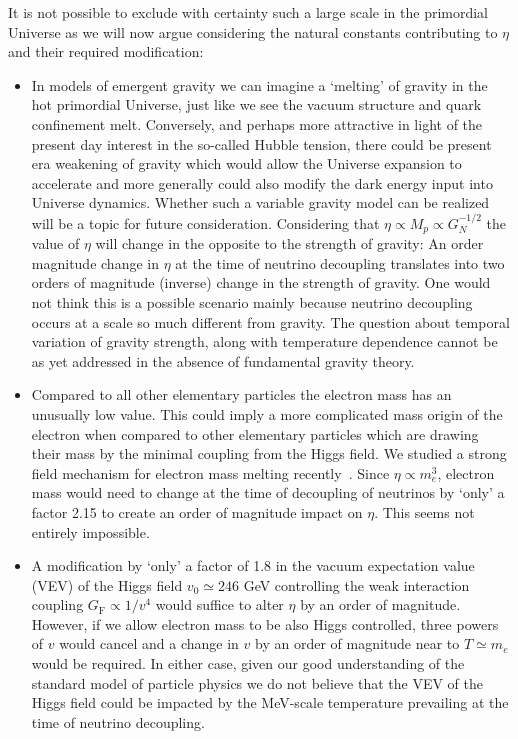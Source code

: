 It is not possible to exclude with certainty such a large scale in the primordial Universe as we will now argue considering the natural constants contributing to $\eta$ and their required
modification:
\begin{itemize}
\item
In models of emergent gravity we can imagine a `melting' of gravity in the hot primordial Universe, just like we see the vacuum structure and quark confinement melt. Conversely, and perhaps more attractive in light of the present day interest in the so-called Hubble tension, there could be present era weakening of gravity which would allow the Universe expansion to accelerate and more generally could also modify the dark energy input into Universe dynamics. Whether such a variable gravity model can be realized will be a topic for future consideration. Considering that $\eta\propto M_p\propto G_N^{-1/2}$ the value of $\eta$ will change in the opposite to the strength of gravity: An order magnitude change in $\eta$ at the time of neutrino decoupling translates into two orders of magnitude (inverse) change in the strength of gravity. One would not think this is a possible scenario mainly because neutrino decoupling occurs at a scale so much different from gravity. The question about temporal variation of gravity strength, along with temperature dependence cannot be as yet addressed in the absence of fundamental gravity theory. 
\item
Compared to all other elementary particles the electron mass has an unusually low value. This could imply a more complicated mass origin of the electron when compared to other elementary particles which are drawing their mass by the minimal coupling from the Higgs field. We studied a strong field mechanism for electron mass melting recently~\cite{Evans:2019zyk}. Since $\eta\propto m_e^3$, electron mass would need to change at the time of decoupling of neutrinos by `only' a factor 2.15 to create an order of magnitude impact on $\eta$. This seems not entirely impossible.
\item
A modification by `only' a factor of 1.8 in the vacuum expectation value (VEV) of the Higgs field $v_0\simeq 246$ GeV controlling the weak interaction coupling $G_\mathrm{F}\propto 1/v^4$ would suffice to alter $\eta$ by an order of magnitude. However, if we allow electron mass to be also Higgs controlled, three powers of $v$ would cancel and a change in $v$ by an order of magnitude near to $T\simeq m_e$ would be required. In either case, given our good understanding of the standard model of particle physics we do not believe that the VEV of the Higgs field could be impacted by the MeV-scale temperature prevailing at the time of neutrino decoupling.
\end{itemize}
